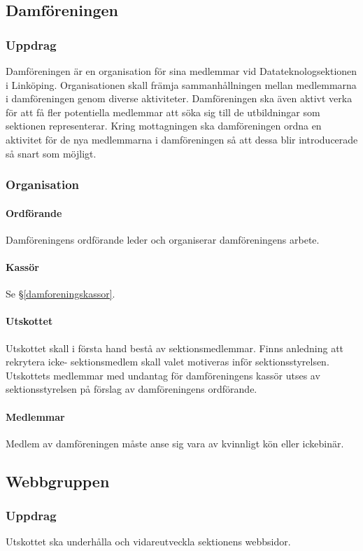 \documentclass{datateknologsektionen-document}
\begin{document}
\subsection{Damföreningen}
\label{damforeningen}

\subsubsection{Uppdrag}
Damföreningen är en organisation för sina medlemmar vid Datateknologsektionen i Linköping.
Organisationen skall främja sammanhållningen mellan medlemmarna i damföreningen genom
diverse aktiviteter. Damföreningen ska även aktivt verka för att få fler potentiella medlemmar
att söka sig till de utbildningar som sektionen representerar. Kring mottagningen ska damföreningen ordna en aktivitet för de nya medlemmarna i damföreningen så att dessa blir introducerade så snart som möjligt.

\subsubsection{Organisation}
\paragraph{Ordförande}
Damföreningens ordförande leder och organiserar damföreningens arbete.
\paragraph{Kassör}
Se \S \ref{damforeningskassor}.
\paragraph{Utskottet}
Utskottet skall i första hand bestå av sektionsmedlemmar. Finns anledning att rekrytera icke-
sektionsmedlem skall valet motiveras inför sektionsstyrelsen. Utskottets medlemmar med
undantag för damföreningens kassör utses av sektionsstyrelsen på förslag av damföreningens
ordförande.
\paragraph{Medlemmar}
Medlem av damföreningen måste anse sig vara av kvinnligt kön eller ickebinär.

\subsection{Webbgruppen}
\label{webb}
\subsubsection{Uppdrag}
Utskottet ska underhålla och vidareutveckla sektionens webbsidor.
\end{document}
